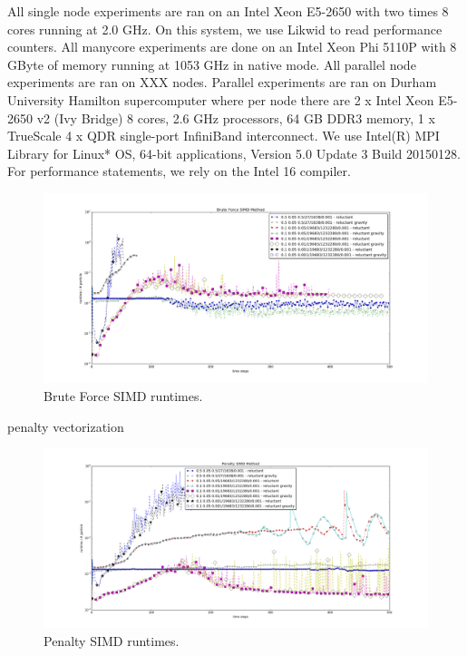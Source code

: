 All single node experiments are ran on an Intel Xeon E5-2650 with two times 8
cores running at 2.0 GHz. 
On this system, we use Likwid \cite{Treibig:10:Likwid} to read performance
counters.
All manycore experiments are done on an Intel Xeon Phi 5110P with 8 GByte of
memory running  at 1053 GHz in native mode.
All parallel node experiments are ran on XXX nodes. Parallel experiments are ran on Durham University Hamilton supercomputer where per node there are 2 x Intel Xeon E5-2650 v2 (Ivy Bridge) 8 cores, 2.6 GHz processors, 64 GB DDR3 memory, 1 x TrueScale 4 x QDR single-port InfiniBand interconnect.
We use Intel(R) MPI Library for Linux* OS, 64-bit applications, Version 5.0 Update 3  Build 20150128. 
For performance statements, we rely on the Intel 16 compiler.



\begin{figure}[htb]
  \begin{center}
    \includegraphics[width=1\textwidth]{experiments/vectorisation/plots/log_bf_simd.png}
  \end{center}
  \caption{Brute Force SIMD runtimes.}
  \label{figure:triangle_omp}
\end{figure}


penalty vectorization

\begin{figure}[htb]
  \begin{center}
    \includegraphics[width=1\textwidth]{experiments/vectorisation/plots/log_penalty_simd.png}
  \end{center}
  \caption{Penalty SIMD runtimes.}
  \label{figure:triangle_omp}
\end{figure}

